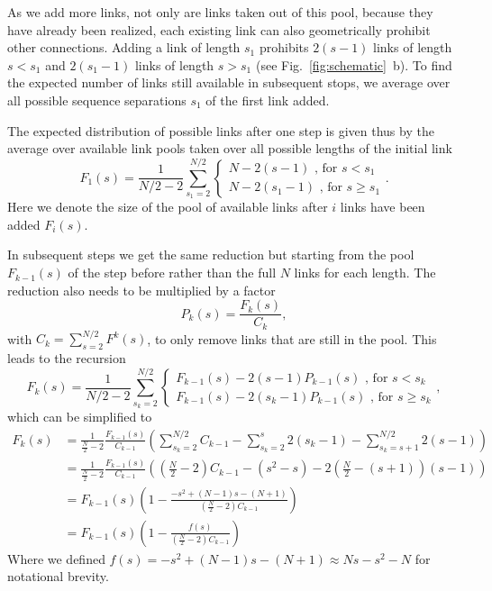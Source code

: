 \documentclass[reprint,amsmath,amssymb,rmp,onecolumn,notitlepage,11pt]{revtex4-1}
\begin{document}
As we add more links, not only are links taken out of this pool, because they have already been realized, each existing link can also geometrically prohibit other connections. Adding a link of length $s_1$ prohibits $2(s-1)$ links of length $s<s_1$ and $2(s_1-1)$ links of length $s>s_1$ (see Fig.~\ref{fig:schematic}~b). To find the expected number of links still available in subsequent stops, we average over all possible sequence separations $s_1$ of the first link added.

The expected distribution of possible links after one step is given thus by the average over available link pools taken over all possible lengths of the initial link
\begin{equation}
    F_1(s)= \frac{1}{N/2-2} \sum_{s_1=2}^{N/2} { \begin{cases}
    N-2(s-1) \text{ , for } s<s_1\\
    N-2(s_1 -1)\text{ , for } s\geq s_1
    \end{cases}}.
\end{equation}
Here we denote the size of the pool of available links after $i$ links have been added $F_i(s)$.

In subsequent steps we get the same reduction but starting from the pool $F_{k-1}(s)$ of the step before rather than the full $N$ links for each length. The reduction also needs to be multiplied by a factor 
\begin{equation}
    P_k(s)=\frac{F_k(s)}{C_k},
    \label{eq.Pk}
\end{equation}
with $C_k=\sum_{s=2}^{N/2}F^k(s)$, to only remove links that are still in the pool. This leads to the recursion
\begin{equation}
    F_k(s)= \frac{1}{N/2-2} \sum_{s_k=2}^{N/2} {\begin{cases}
     F_{k-1}(s)-2(s-1) P_{k-1}(s) \text{ , for } s<s_k\\
     F_{k-1}(s)-2(s_k -1)P_{k-1}(s)\text{ , for } s\geq s_k
    \end{cases}},
\end{equation}
which can be simplified to
\begin{align}
   F_k(s)&= \frac{1}{\frac{N}{2}-2} \frac{F_{k-1}(s)}{C_{k-1}}\left( \sum_{s_k=2}^{N/2}C_{k-1} - \sum_{s_k=2}^{s} 2(s_k-1) - \sum_{s_k=s+1}^{N/2} 2(s -1) \right) \nonumber \\
   &= \frac{1}{\frac{N}{2}-2}\frac{F_{k-1}(s)}{C_{k-1}}\left(\left(\frac{N}{2}-2\right)C_{k-1} -(s^2-s)-2\left(\frac{N}{2}-(s+1)\right)(s-1)\right)  \nonumber \\
   &= F_{k-1}(s)\left(1-\frac{-s^2 +(N-1)s-(N+1)}{(\frac{N}{2}-2)C_{k-1}} \right)\nonumber \\
   &=F_{k-1}(s)\left(1-\frac{f(s)}{(\frac{N}{2}-2)C_{k-1}} \right)
   \label{eq.Fk_rec}
\end{align}
Where we defined $f(s)=-s^2 +(N-1)s-(N+1) \approx N s - s^2 - N$ for notational brevity.
\end{document}
